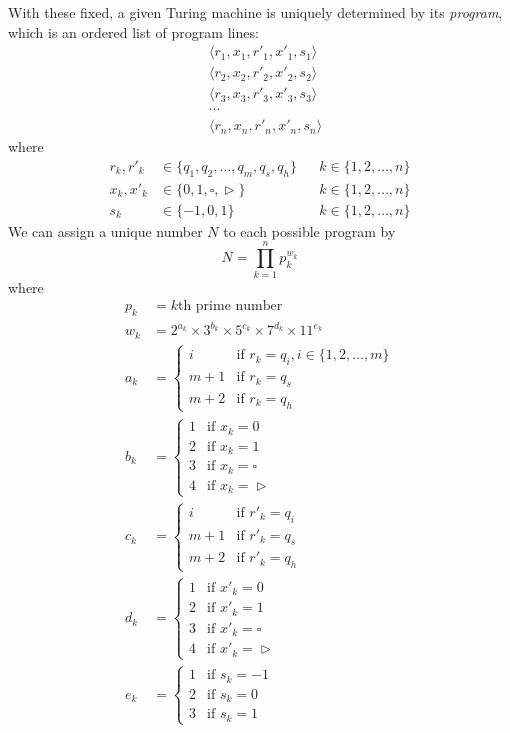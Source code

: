 \documentclass[12pt]{extarticle}
\begin{document}
With these fixed, a given Turing machine is uniquely determined by its \textit{program}, which is an ordered list of program lines:
\begin{align*}
& \langle r_1, x_1, r'_1, x'_1, s_1 \rangle \\
& \langle r_2, x_2, r'_2, x'_2, s_2 \rangle \\
& \langle r_3, x_3, r'_3, x'_3, s_3 \rangle \\
& \cdots \\
& \langle r_n, x_n, r'_n, x'_n, s_n \rangle
\end{align*}
where
\begin{align*}
r_k, r'_k & \in \{q_1, q_2, \ldots, q_m, q_s, q_h\}   && k\in\{1,2,\dots, n\}\\
x_k, x'_k & \in \{0, 1, \square, \vartriangleright\} && k\in\{1,2,\dots, n\}\\
s_k & \in \{-1, 0, 1\} && k\in\{1,2,\dots, n\}
\end{align*}
We can assign a unique number $N$ to each possible program by
\[
N = \prod_{k=1}^n p_k^{w_k}
\]
where
\begin{align*}
p_k & = k\text{th prime number}\\
w_k & = 2^{a_k} \times 3^{b_k} \times 5^{c_k} \times 7^{d_k} \times 11^{e_k} \\
a_k & = \begin{cases}i & \text{if }r_k = q_i, i\in\{1,2,\dots,m\}\\m+1 & \text{if }r_k = q_s\\m+2 & \text{if }r_k = q_h\end{cases}\\
b_k & = \begin{cases}1 & \text{if }x_k = 0\\2 & \text{if }x_k = 1\\3 & \text{if }x_k = \square\\4 & \text{if }x_k = \vartriangleright\end{cases}\\
c_k & = \begin{cases}i & \text{if }r'_k = q_i\\m+1 & \text{if }r'_k = q_s\\m+2 & \text{if }r'_k = q_h\end{cases}\\
d_k & = \begin{cases}1 & \text{if }x'_k = 0\\2 & \text{if }x'_k = 1\\3 & \text{if }x'_k = \square\\4 & \text{if }x'_k = \vartriangleright\end{cases}\\
e_k & = \begin{cases}1 & \text{if }s_k = -1\\2 & \text{if }s_k = 0\\3 & \text{if }s_k = 1\end{cases}
\end{align*}
\end{document}
